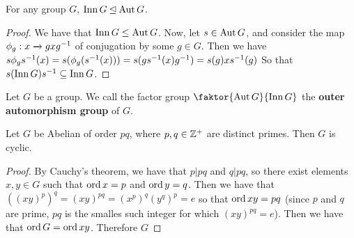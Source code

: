 \begin{lemma}\label{4.4.7}
    For any group $G$,  $\operatorname{Inn}{G} \unlhd \operatorname{Aut}{G}$.
\end{lemma}
\begin{proof}
    We have that $\operatorname{Inn}{G} \leq \operatorname{Aut}{G}$. Now, let $s \in \operatorname{Aut}{G}$, and consider
    the map $\phi_g:x \xrightarrow{} gxg^{-1}$ of conjugation by some $g \in G$.
    Then we have $s\phi_gs^{-1}(x)=s(\phi_g(s^{-1}(x)))=s(gs^{-1}(x)g^{-1})=
    s(g)xs^{-1}(g)$ So that $s(\operatorname{Inn}{G})s^{-1} \subseteq \operatorname{Inn}{G}$.
\end{proof}

\begin{definition}
    Let $G$ be a group. We call the factor group  $\faktor{\Aut{G}}{\Inn{G}}$
    the \textbf{outer automorphism group} of $G$.
\end{definition}

\begin{lemma}\label{4.4.8}
    Let $G$ be Abelian of order $pq$, where $p,q \in \mathbb{Z}^+$ are distinct primes.
    Then $G$ is cyclic.
\end{lemma}
\begin{proof}
    By Cauchy's theorem, we have that $p|pq$ and  $q|pq$, so there exist
    elements  $x,y \in G$ such that  $\operatorname{ord}{x}=p$ and $\operatorname{ord}{y}=q$. Then we have
    that $((xy)^p)^q=(xy)^{pq}=(x^p)^q(y^q)^p=e$ so that $\operatorname{ord}{xy}=pq$ (since
    $p$ and $q$ are prime, $pq$ is the smalles such integer for which
    $(xy)^{pq}=e$). Then we have that $\operatorname{ord}{G}=\operatorname{ord}{xy}$. Therefore $G$
\end{proof}
